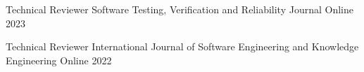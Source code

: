 



\begin{cvhonors}
  \cvhonor
    {Technical Reviewer} %
    {Software Testing, Verification and Reliability Journal} %
    {Online} %
    {2023} %
    
  \cvhonor
    {Technical Reviewer} %
    {International Journal of Software Engineering and Knowledge Engineering} %
    {Online} %
    {2022} %

\end{cvhonors}




